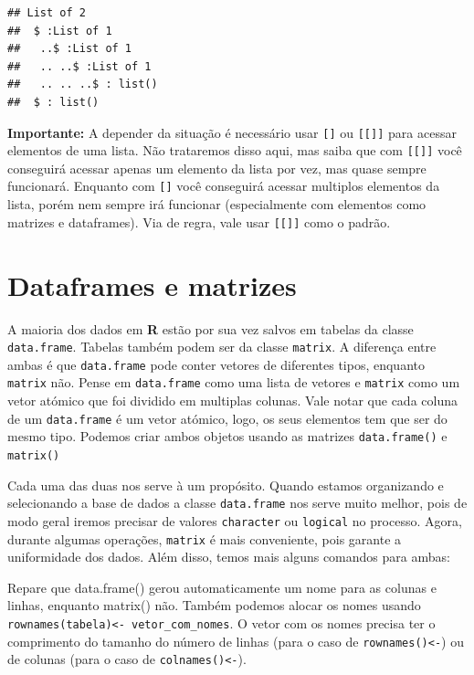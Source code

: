 \documentclass[
]{article}
\begin{document}
\begin{verbatim}
## List of 2
##  $ :List of 1
##   ..$ :List of 1
##   .. ..$ :List of 1
##   .. .. ..$ : list()
##  $ : list()
\end{verbatim}

\textbf{Importante:} A depender da situação é necessário usar
\texttt{{[}{]}} ou \texttt{{[}{[}{]}{]}} para acessar elementos de uma
lista. Não trataremos disso aqui, mas saiba que com
\texttt{{[}{[}{]}{]}} você conseguirá acessar apenas um elemento da
lista por vez, mas quase sempre funcionará. Enquanto com \texttt{{[}{]}}
você conseguirá acessar multiplos elementos da lista, porém nem sempre
irá funcionar (especialmente com elementos como matrizes e dataframes).
Via de regra, vale usar \texttt{{[}{[}{]}{]}} como o padrão.

\hypertarget{dataframes-e-matrizes}{%
\section{Dataframes e matrizes}\label{dataframes-e-matrizes}}

A maioria dos dados em \textbf{R} estão por sua vez salvos em tabelas da
classe \texttt{data.frame}. Tabelas também podem ser da classe
\texttt{matrix}. A diferença entre ambas é que \texttt{data.frame} pode
conter vetores de diferentes tipos, enquanto \texttt{matrix} não. Pense
em \texttt{data.frame} como uma lista de vetores e \texttt{matrix} como
um vetor atómico que foi dividido em multiplas colunas. Vale notar que
cada coluna de um \texttt{data.frame} é um vetor atómico, logo, os seus
elementos tem que ser do mesmo tipo. Podemos criar ambos objetos usando
as matrizes \texttt{data.frame()} e \texttt{matrix()}

Cada uma das duas nos serve à um propósito. Quando estamos organizando e
selecionando a base de dados a classe \texttt{data.frame} nos serve
muito melhor, pois de modo geral iremos precisar de valores
\texttt{character} ou \texttt{logical} no processo. Agora, durante
algumas operações, \texttt{matrix} é mais conveniente, pois garante a
uniformidade dos dados. Além disso, temos mais alguns comandos para
ambas:

Repare que data.frame() gerou automaticamente um nome para as colunas e
linhas, enquanto matrix() não. Também podemos alocar os nomes usando
\texttt{rownames(tabela)\textless{}-\ vetor\_com\_nomes}. O vetor com os
nomes precisa ter o comprimento do tamanho do número de linhas (para o
caso de \texttt{rownames()\textless{}-}) ou de colunas (para o caso de
\texttt{colnames()\textless{}-}).
\end{document}
